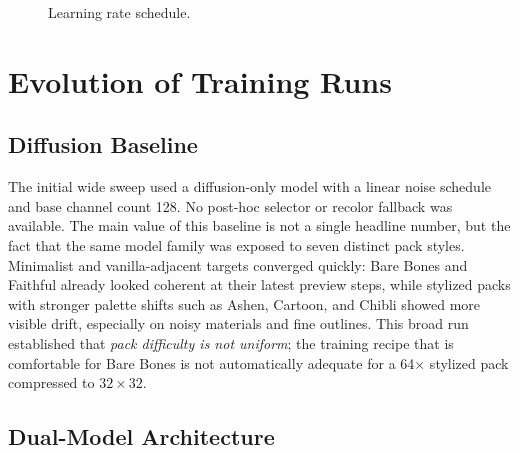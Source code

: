 \begin{figure}[htbp]
    \centering
    \caption{Learning rate schedule.}
    \label{fig:lr-schedule}
\end{figure}

\section{Evolution of Training Runs}

\subsection{Diffusion Baseline}

The initial wide sweep used a diffusion-only model with a linear noise schedule
and base channel count 128. No post-hoc selector or recolor fallback was
available. The main value of this baseline is not a single headline number,
but the fact that the same model family was exposed to seven distinct pack
styles. Minimalist and vanilla-adjacent targets converged quickly: Bare Bones
and Faithful already looked coherent at their latest preview steps, while
stylized packs with stronger palette shifts such as Ashen, Cartoon, and
Chibli showed more visible drift, especially on noisy materials and fine
outlines. This broad run established that \emph{pack difficulty is not
uniform}; the training recipe that is comfortable for Bare Bones is not
automatically adequate for a 64$\times$ stylized pack compressed to
$32\times32$.

\subsection{Dual-Model Architecture}

